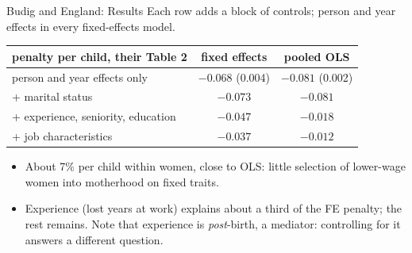 \documentclass[aspectratio=169,11pt,xcolor=dvipsnames]{beamer}
\begin{document}
\begin{frame}{Budig and England: Results}
Each row adds a block of controls; person and year effects in every fixed-effects model.
\vskip3pt
\begin{center}\small
\renewcommand{\arraystretch}{1.12}
\begin{tabular}{@{}lcc@{}}
\toprule
penalty per child, their Table 2 & fixed effects & pooled OLS \\
\midrule
person and year effects only & $-0.068$ (0.004) & $-0.081$ (0.002) \\
+ marital status & $-0.073$ & $-0.081$ \\
+ experience, seniority, education & $-0.047$ & $-0.018$ \\
+ job characteristics & $-0.037$ & $-0.012$ \\
\bottomrule
\end{tabular}
\end{center}
\vskip3pt
\begin{itemize}\itemsep2pt
  \item About 7\% per child within women, close to OLS: little selection of
        lower-wage women into motherhood on fixed traits.
  \item Experience (lost years at work) explains about a third of the FE
        penalty; the rest remains. Note that experience is \emph{post}-birth,
        a mediator: controlling for it answers a different question.
\end{itemize}
\end{frame}
\end{document}
